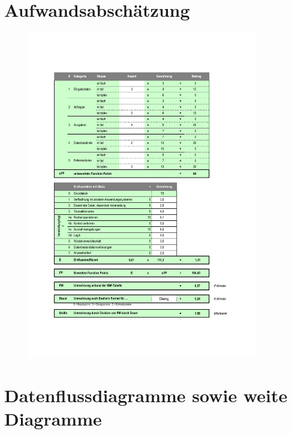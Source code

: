 \documentclass[a4paper,listof=leveldown,listof=numbered]{scrreprt}
\begin{document}
	\listoffigures
	
	\section{Aufwandsabschätzung}

	\begin{figure}
		\centering
		\includegraphics[width=0.9\textwidth]{data/Aufwandsabschaetzung.pdf}
	\end{figure}
	
	\section{Datenflussdiagramme sowie weite Diagramme}
\end{document}
